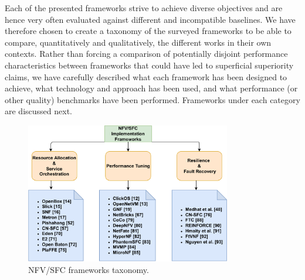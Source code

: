 \documentclass[futureinternet,review,accept,pdftex,moreauthors]{Definitions/mdpi}
\begin{document}
Each of the presented frameworks strive to achieve diverse objectives and are hence very often evaluated against different and incompatible baselines. We have therefore chosen to create a taxonomy of the surveyed frameworks to be able to compare, quantitatively and qualitatively, the different works in their own contexts. Rather than forcing a comparison of potentially disjoint performance characteristics between frameworks that could have led to superficial superiority claims, we have carefully described what each framework has been designed to achieve, what technology and approach has been used, and what performance (or other quality) benchmarks have been performed. Frameworks under each category are discussed next.


\begin{figure}[H]%
\includegraphics[width=0.8\textwidth]{Taxonomy.pdf}
\caption{{NFV/SFC} %
 frameworks taxonomy.}
\label{Taxonomy}
\end{figure}
\end{document}
